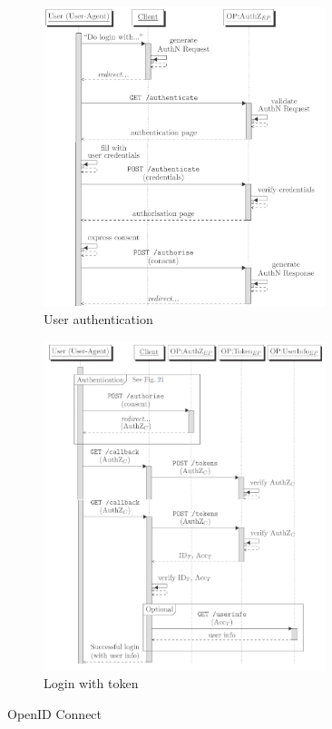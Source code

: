 \begin{figure}[H]
  \centering
  \begin{subfigure}{.49\textwidth}
    \centering
    \includegraphics[width=0.9\textwidth]{img/oicd user auth.png}
    \caption{User authentication}
  \end{subfigure}
  \begin{subfigure}{.49\textwidth}
    \centering
    \includegraphics[width=0.9\textwidth]{img/oicd token login.png}
    \caption{Login with token}
  \end{subfigure}
  \caption{OpenID Connect}
  \label{fig:openid-connect}
\end{figure}


